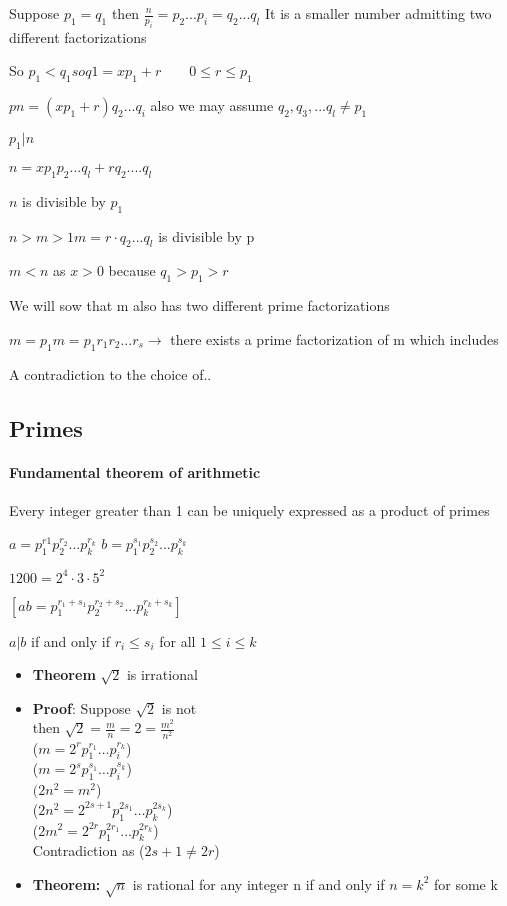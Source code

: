 \documentclass[9pt, letterpaper, oneside]{article}
\begin{document}
Suppose $p_1 = q_1$ then $\frac{n}{p_i} = p_2...p_i = q_2 ... q_l$
It is a smaller number admitting two different factorizations

So $p_1 < q_1 so q1 = xp_1 + r \qquad 0 \leq r \leq p_1$

$pn = (xp_1 + r )q_2 ... q_i$ also we may assume $q_2, q_3 , ... q_l \neq p_1$

$p_1 | n$ 

$n = xp_1p_2...q_l + rq_2 .... q_l$

$n$ is divisible by $p_1$

$n > m > 1 m = r \cdot q_2...q_l$ is divisible by p

$m < n$ as $x > 0$ because $q_1 > p_1 > r$

We will sow that m also has two different prime factorizations 

$m = p_1m = p_1r_1r_2...r_s \to$ there exists a prime factorization of m which includes 

A contradiction to the choice of..




\subsection{Primes}

\paragraph{Fundamental theorem of arithmetic} Every integer greater than 1 can be uniquely expressed as a product of primes

$a=p_1^{r1}p_2^{r_2}...p_k^{r_k}$
$b = p_1^{s_1}p_2^{s_2}...p_k^{s_k}$

$1200 = 2^4\cdot 3 \cdot 5^2$

$[ab = p_1^{r_1 + s_1} p_2^{r_2 + s_2} ... p_k^{r_k + s_k}]$

$a | b$ if and only if $r_i \leq s_i$ for all $1 \leq i \leq k$

\begin{itemize}
    \item \textbf{Theorem} $\sqrt{2}$ is irrational
    \item \textbf{Proof}: Suppose $\sqrt{2}$ is not \\
    then $\sqrt{2} = \frac{m}{n} = 2 = \frac{m^2}{n^2}$ \\
    ($m = 2^r p_1^{r_1} \ldots p_i^{r_k}$)\\
    ($m = 2^s p_1^{s_1} \ldots p_i^{s_k}$)\\
    $(2n^2 = m^2$)\\
    ($2n^2 = 2^{2s+1} p_1^{2s_1} \ldots p_k^{2s_k}$)\\
    ($2m^2 = 2^{2r} p_1^{2r_1} \ldots p_k^{2r_k}$)\\
    Contradiction as ($2s+1 \neq 2r$)
    \item \textbf{Theorem:} $\sqrt{n}$ is rational for any integer n if and only if $n = k^2$ for some k
\end{itemize}
\end{document}
